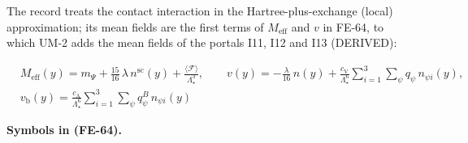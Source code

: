 \documentclass[
  10pt,
]{article}
\begin{document}
The record treats the contact interaction in the Hartree-plus-exchange
(local) approximation; its mean fields are the first terms of
\(M_{\mathrm{eff}}\) and \(v\) in FE-64, to which UM-2 adds the mean
fields of the portals I11, I12 and I13 (DERIVED):

\[
\begin{aligned}
&M_{\mathrm{eff}}(y) = m_\Psi + \frac{15}{16}\,\lambda\,n^{\mathrm{sc}}(y) +
 \frac{\langle\mathcal{F}\rangle}{\Lambda_\star^3},\qquad
 v(y) = -\frac{\lambda}{16}\,n(y) + \frac{c_{\mathrm{V}}}{\Lambda_\star^6}\sum_{i=1}^{3}\sum_\psi
 q_\psi\,n_{\psi i}(y),\\
&v_{\mathrm{b}}(y) = \frac{c_{\mathrm{A}}}{\Lambda_\star^6}\sum_{i=1}^{3}\sum_\psi q^{B}_\psi\,n_{\psi i}(y)
\end{aligned} \tag{FE-64}
\]

\textbf{Symbols in (FE-64).}
\end{document}
